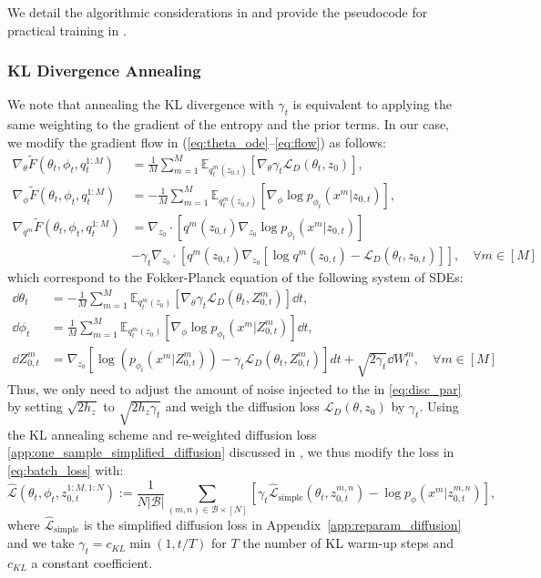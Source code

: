 We detail the algorithmic considerations in  and provide the pseudocode for practical training in .

\subsubsection{KL Divergence Annealing} 
\label{app:kl_anneal_deriv}
We note that annealing the KL divergence with $\gamma_t$ is equivalent to applying the same weighting to the gradient of the entropy and the prior terms. In our case, we modify the gradient flow in (\ref{eq:theta_ode}--\ref{eq:flow}) as follows:
\begin{align}
    \nabla_\theta \tilde{F}(\theta_t, \phi_t, q_t^{1:M}) &= \frac{1}{M}\sum_{m=1}^M\mathbb{E}_{q_t^m(z_{0,t})}\left[\nabla_{\theta} \gamma_t\mathcal{L}_D(\theta_t, z_{0})\right], \\
    \nabla_\phi \tilde{F}(\theta_t, \phi_t, q_t^{1:M}) 
    &=-\frac{1}{M}\sum_{m=1}^M\mathbb{E}_{q_t^m(z_{0,t})}\left[\nabla_{\phi} \log p_{\phi_t}( x^m | z_{0,t})\right], \\
    \nabla_{q^m} \tilde{F}(\theta_t, \phi_t, q_t^{1:M}) &= \nabla_{z_{0}} \cdot [
        q^m(z_{0,t}) \nabla_{z_{0}}
            \log 
                p_{\phi_t}( x^m|z_{0,t})] \\
    &- \gamma_t \nabla_{z_{0}}\cdot[q^m(z_{0,t}) \nabla_{z_0} [\log {q^m(z_{0,t})}
             - \mathcal{L}_D(\theta_t, z_{0,t})
        ]
    ],  \quad\forall m\in [M]
\end{align}
which correspond to the Fokker-Planck equation of the following system of SDEs:
\begin{align}
\dd {\theta}_t &= -\frac{1}{M}\sum_{m=1}^M\mathbb{E}_{q^m_t(z_0)}\left[\nabla_{\theta} \gamma_t\mathcal{L}_D(\theta_t, Z_{0,t}^m)\right] \dd t, \\
    \dd {\phi}_t &= \frac{1}{M}\sum_{m=1}^M\mathbb{E}_{q^m_t(z_0)}\left[\nabla_{\phi} \log p_{\phi_t}( x^m | Z_{0,t}^m)\right] \dd t, \\
    \dd Z_{0,t}^m &= \nabla_{z_{0}} [\log(p_{\phi_t}( x^m|Z_{0,t}^m))-\gamma_t\mathcal{L}_D(\theta_t,Z_{0,t}^m)]dt+\sqrt{2 \gamma_t} \dd W_{t}^m, \quad\forall m\in [M]
\end{align}
Thus, we only need to adjust the amount of noise injected to the in \eqref{eq:disc_par} by setting $\sqrt{2h_z}$ to $\sqrt{2h_z \gamma_t}$ and weigh the diffusion loss $\mathcal{L}_D(\theta, z_0)$ by $\gamma_t$. Using the KL annealing scheme and re-weighted diffusion loss \eqref{app:one_sample_simplified_diffusion} discussed in , we thus modify the loss in \eqref{eq:batch_loss} with:
\begin{equation}
        \hat{\mathcal{L}}(\theta_t,\phi_t,z^{1:M,1:N}_{0,t}) := \frac{1}{N |\mathcal{B}|} \sum_{(m,n)\in  \mathcal{B} \times [N]} \left[
    \gamma_t\hat{\mathcal{L}}_{\text{simple}}(\theta_t, z_{0,t}^{m,n}) - \log p_\phi ( x^m | z_{0,t}^{m,n})
    \right],\label{eq:loss_kl_anneal}
\end{equation}
where $\hat{\mathcal{L}}_{\text{simple}}$ is the simplified diffusion loss in Appendix~\ref{app:reparam_diffusion} and we take $\gamma_t = c_{KL}\min (1, t/T)$ for $T$ the number of KL warm-up steps and $c_{KL}$ a constant coefficient. 


